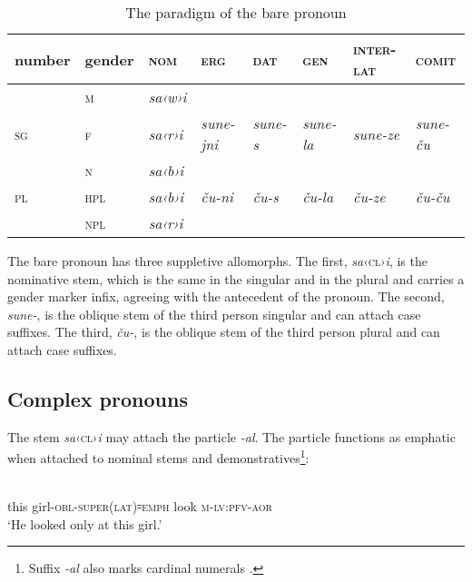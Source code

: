 ﻿\documentclass[output=paper]{langsci/langscibook}
\begin{document}
\begin{table}[h]
  \caption{The paradigm of the bare pronoun}\label{tab:10:1}

  \advance\tabcolsep-1.5pt
\begin{tabular}{@{}llllllll@{}}
\toprule
{number} & {gender}\footnotemark & \textsc{nom} & \textsc{erg} & \textsc{dat} & \textsc{gen}
& \textsc{inter}-\textsc{lat} & \textsc{comit}\tabularnewline \midrule
& \textsc{m} & \emph{sa‹w›i} & & & & &\tabularnewline
\textsc{sg} & \textsc{f} & \emph{sa‹r›i} & \emph{sune-jni} & \emph{sune-s} & \emph{sune-la} & \emph{sune-ze} & \emph{sune-ču}\tabularnewline
& \textsc{n} & \emph{sa‹b›i} & & & & &\tabularnewline
\textsc{pl} & \textsc{hpl} & \emph{sa‹b›i} & \emph{ču-ni} & \emph{ču-s} & \emph{ču-la} & \emph{ču-ze} &
\emph{ču-ču}\tabularnewline
& \textsc{npl} & \emph{sa‹r›i} & & & & &\tabularnewline
\bottomrule
\end{tabular}
\end{table}


The bare pronoun has three suppletive allomorphs. The first,
\emph{sa}‹\textsc{cl}›\emph{i}, is the nominative stem, which is the same in the
singular and in the plural and carries a gender marker infix, agreeing
with the antecedent of the pronoun. The second, \emph{sune-}, is the
oblique stem of the third person singular and can attach case suffixes.
The third, \emph{ču-}, is the oblique stem of the third person plural and
can attach case suffixes.

\subsection{Complex pronouns}

The stem \emph{sa}‹\textsc{cl}›\emph{i} may attach the particle \emph{-al}. The
particle functions as emphatic when attached to nominal stems and
demonstratives\footnote{Suffix \emph{-al} also marks cardinal numerals
  \citep[58]{magometov1982}.}:

\ea
{}\\
this girl-\textsc{obl}-\textsc{super}(\textsc{lat})꞊\textsc{emph} look \textsc{m}-\textsc{lv}:\textsc{pfv}-\textsc{aor}\\ 
\glt `He looked only at this girl.'
\end{document}
